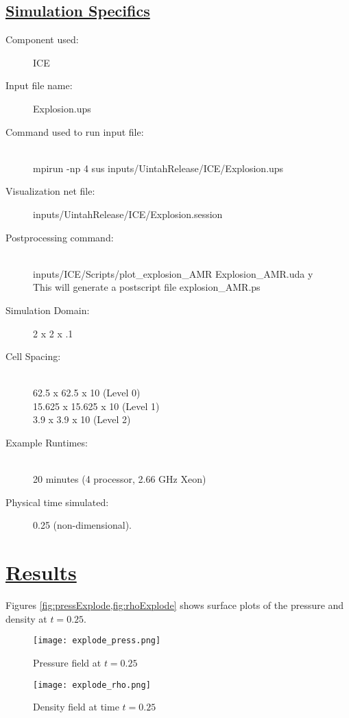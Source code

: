 \subsection*{\underline{Simulation Specifics}}
\begin{description} 
\item [Component used:] \hfill ICE
\item [Input file name:] \hfill Explosion.ups
\item [Command used to run input file:]\hfill \\
      mpirun -np 4 sus inputs/UintahRelease/ICE/Explosion.ups
\item [Visualization net file:]\hfill inputs/UintahRelease/ICE/Explosion.session\\
\item [Postprocessing command:]\hfill \\
inputs/ICE/Scripts/plot\_explosion\_AMR Explosion\_AMR.uda y\\
This will generate a postscript file explosion\_AMR.ps


\item [Simulation Domain:]\hfill    2 x 2 x .1
\item [Cell Spacing:]\hfill \\ 
62.5    x 62.5    x 10 (Level 0)\\
15.625  x 15.625  x 10 (Level 1)\\
3.9     x 3.9     x 10 (Level 2)

\item [Example Runtimes:] \hfill \\
 20 minutes   (4 processor, 2.66 GHz Xeon)

\item [Physical time simulated:] \hfill 0.25 (non-dimensional).

\end{description}

\section*{\underline{Results}}
Figures \ref{fig:pressExplode,fig:rhoExplode} shows surface plots of the pressure and density at $t=0.25.$  
\newpage
\begin{figure}
  \texttt{[image: explode\_press.png]}
  \caption{Pressure field at $t=0.25$}
  \label{fig:pressExplode}
\end{figure}
%
\newpage
\begin{figure}
  \texttt{[image: explode\_rho.png]}
  \caption{Density field at time $t=0.25$}
  \label{fig:rhoExplode}
\end{figure}
\newpage

